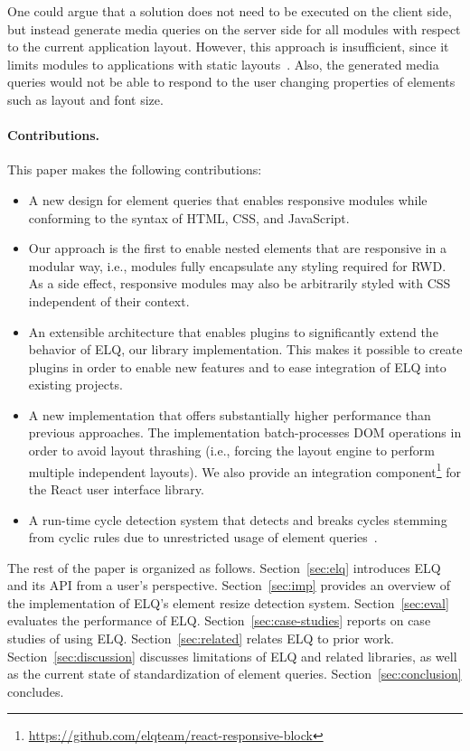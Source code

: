 \documentclass[sigconf,9pt]{acmart}
\newcommand{\elq}{ELQ}
\begin{document}
    One could argue that a solution does not need to be executed on the client side, but instead generate media queries on the server side for all modules with respect to the current application layout.
    However, this approach is insufficient, since it limits modules to applications with static layouts~\cite{elq-thesis}. Also, the generated media queries would not be able to respond to the user changing properties of elements such as layout and font size.

  \paragraph{Contributions.}
    This paper makes the following contributions:
    \begin{itemize}
      \item A new design for element queries that enables responsive modules while conforming to the syntax of HTML, CSS, and JavaScript.
      \item
        Our approach is the first to enable nested elements that are responsive in a modular way, i.e., modules fully encapsulate any styling required for RWD.
        As a side effect, responsive modules may also be arbitrarily styled with CSS independent of their context.
      \item
        An extensible architecture that enables plugins to significantly extend the behavior of ELQ, our library implementation.
        This makes it possible to create plugins in order to enable new features and to ease integration of \elq{} into existing projects.
      \item
        A new implementation that offers substantially higher performance than previous approaches.
        The implementation batch-processes DOM operations in order to avoid layout thrashing (i.e., forcing the layout engine to perform multiple independent layouts). We also provide an integration component\footnote{\url{https://github.com/elqteam/react-responsive-block}} for the React user interface library.
      \item
        A run-time cycle detection system that detects and breaks cycles stemming from cyclic rules due to unrestricted usage of element queries~\cite{elq-thesis}.
    \end{itemize}

  The rest of the paper is organized as follows.
  Section~\ref{sec:elq} introduces \elq{} and its API from a user's perspective.
  Section~\ref{sec:imp} provides an overview of the implementation of \elq{}'s element resize detection system.
  Section~\ref{sec:eval} evaluates the performance of \elq{}.
  Section~\ref{sec:case-studies} reports on case studies of using \elq{}.
  Section~\ref{sec:related} relates \elq{} to prior work.
  Section~\ref{sec:discussion} discusses limitations of \elq{} and related libraries, as well as the current state of standardization of element queries.
  Section~\ref{sec:conclusion} concludes.
\end{document}
